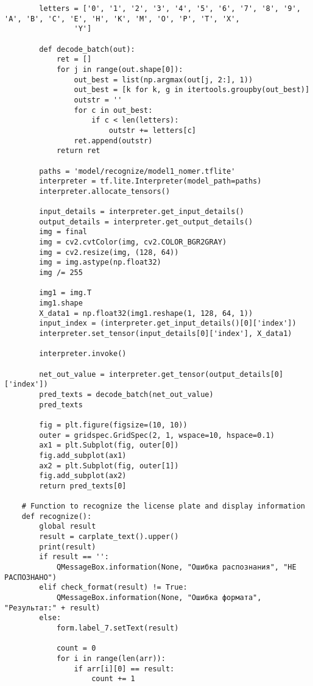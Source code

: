 \begin{lstlisting}
        letters = ['0', '1', '2', '3', '4', '5', '6', '7', '8', '9', 'A', 'B', 'C', 'E', 'H', 'K', 'M', 'O', 'P', 'T', 'X',
                'Y']

        def decode_batch(out):
            ret = []
            for j in range(out.shape[0]):
                out_best = list(np.argmax(out[j, 2:], 1))
                out_best = [k for k, g in itertools.groupby(out_best)]
                outstr = ''
                for c in out_best:
                    if c < len(letters):
                        outstr += letters[c]
                ret.append(outstr)
            return ret

        paths = 'model/recognize/model1_nomer.tflite'
        interpreter = tf.lite.Interpreter(model_path=paths)
        interpreter.allocate_tensors()

        input_details = interpreter.get_input_details()
        output_details = interpreter.get_output_details()
        img = final
        img = cv2.cvtColor(img, cv2.COLOR_BGR2GRAY)
        img = cv2.resize(img, (128, 64))
        img = img.astype(np.float32)
        img /= 255

        img1 = img.T
        img1.shape
        X_data1 = np.float32(img1.reshape(1, 128, 64, 1))
        input_index = (interpreter.get_input_details()[0]['index'])
        interpreter.set_tensor(input_details[0]['index'], X_data1)

        interpreter.invoke()

        net_out_value = interpreter.get_tensor(output_details[0]['index'])
        pred_texts = decode_batch(net_out_value)
        pred_texts

        fig = plt.figure(figsize=(10, 10))
        outer = gridspec.GridSpec(2, 1, wspace=10, hspace=0.1)
        ax1 = plt.Subplot(fig, outer[0])
        fig.add_subplot(ax1)
        ax2 = plt.Subplot(fig, outer[1])
        fig.add_subplot(ax2)
        return pred_texts[0]

    # Function to recognize the license plate and display information
    def recognize():
        global result
        result = carplate_text().upper()
        print(result)
        if result == '':
            QMessageBox.information(None, "Ошибка распознания", "НЕ РАСПОЗНАНО")
        elif check_format(result) != True:
            QMessageBox.information(None, "Ошибка формата", "Результат:" + result)
        else:
            form.label_7.setText(result)

            count = 0
            for i in range(len(arr)):
                if arr[i][0] == result:
                    count += 1


\end{lstlisting}
